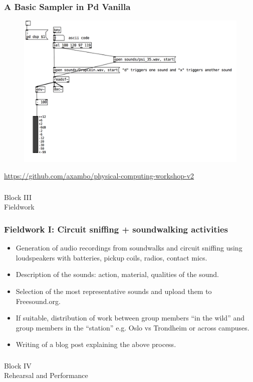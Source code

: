 \documentclass[screen, aspectratio=43]{beamer}
\begin{document}
%
\begin{frame}
  \frametitle{A Basic Sampler in Pd Vanilla}
   \begin{figure}
	\includegraphics[scale=0.3]{img/Pd-basic-sampler.png}
\end{figure}
{\tiny
\url{https://github.com/axambo/physical-computing-workshop-v2}
}
\end{frame}
%

\usebackgroundtemplate{}
\begin{frame}
\frametitle{}
{\huge Block III\\Fieldwork}
\end{frame}

\begin{frame}
  \frametitle{Fieldwork I: Circuit sniffing + soundwalking activities}
        \begin{itemize}
	\item Generation of audio recordings from soundwalks and circuit sniffing using loudspeakers with batteries, pickup coils, radios, contact mics.
	\item Description of the sounds: action, material, qualities of the sound. 
	\item Selection of the most representative sounds and upload them to Freesound.org.
	\item If suitable, distribution of work between group members ``in the wild'' and group members in the ``station'' e.g. Oslo vs Trondheim or across campuses. 
	\item Writing of a blog post explaining the above process.
    \end{itemize} 
\end{frame}

\usebackgroundtemplate{}
\begin{frame}
\frametitle{}
{\huge Block IV\\Rehearsal and Performance}
\end{frame}
\end{document}
